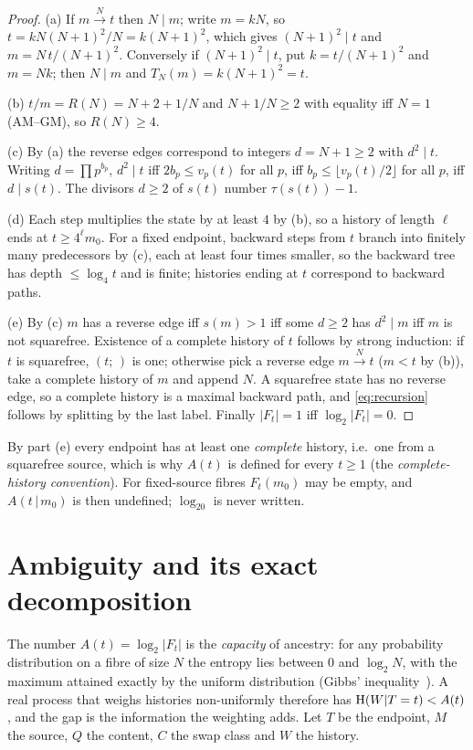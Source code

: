 \begin{proof}
(a) If $m\xrightarrow{N}t$ then $N\mid m$; write $m=kN$, so $t=kN(N{+}1)^2/N=k(N{+}1)^2$, which gives $(N{+}1)^2\mid t$ and $m=N\,t/(N{+}1)^2$. Conversely if $(N{+}1)^2\mid t$, put $k=t/(N{+}1)^2$ and $m=Nk$; then $N\mid m$ and $T_N(m)=k(N{+}1)^2=t$.

(b) $t/m=R(N)=N+2+1/N$ and $N+1/N\ge2$ with equality iff $N=1$ (AM--GM), so $R(N)\ge4$.

(c) By (a) the reverse edges correspond to integers $d=N{+}1\ge2$ with $d^2\mid t$. Writing $d=\prod p^{b_p}$, $d^2\mid t$ iff $2b_p\le v_p(t)$ for all $p$, iff $b_p\le\lfloor v_p(t)/2\rfloor$ for all $p$, iff $d\mid s(t)$. The divisors $d\ge2$ of $s(t)$ number $\tau(s(t))-1$.

(d) Each step multiplies the state by at least $4$ by (b), so a history of length $\ell$ ends at $t\ge4^\ell m_0$. For a fixed endpoint, backward steps from $t$ branch into finitely many predecessors by (c), each at least four times smaller, so the backward tree has depth $\le\log_4 t$ and is finite; histories ending at $t$ correspond to backward paths.

(e) By (c) $m$ has a reverse edge iff $s(m)>1$ iff some $d\ge2$ has $d^2\mid m$ iff $m$ is not squarefree. Existence of a complete history of $t$ follows by strong induction: if $t$ is squarefree, $(t;\,)$ is one; otherwise pick a reverse edge $m\xrightarrow{N}t$ ($m<t$ by (b)), take a complete history of $m$ and append $N$. A squarefree state has no reverse edge, so a complete history is a maximal backward path, and \eqref{eq:recursion} follows by splitting by the last label. Finally $|F_t|=1$ iff $\log_2|F_t|=0$.
\end{proof}

By part (e) every endpoint has at least one \emph{complete} history, i.e.\ one from a squarefree source, which is why $A(t)$ is defined for every $t\ge1$ (the \emph{complete-history convention}). For fixed-source fibres $F_t(m_0)$ may be empty, and $A(t\,|\,m_0)$ is then undefined; $\log_20$ is never written.

\section{Ambiguity and its exact decomposition}
The number $A(t)=\log_2|F_t|$ is the \emph{capacity} of ancestry: for any probability distribution on a fibre of size $N$ the entropy lies between $0$ and $\log_2N$, with the maximum attained exactly by the uniform distribution (Gibbs' inequality~\cite{CoverThomas}). A real process that weighs histories non-uniformly therefore has $\mathrm{H}(W|T=t)<A(t)$, and the gap is the information the weighting adds. Let $T$ be the endpoint, $M$ the source, $Q$ the content, $C$ the swap class and $W$ the history.

